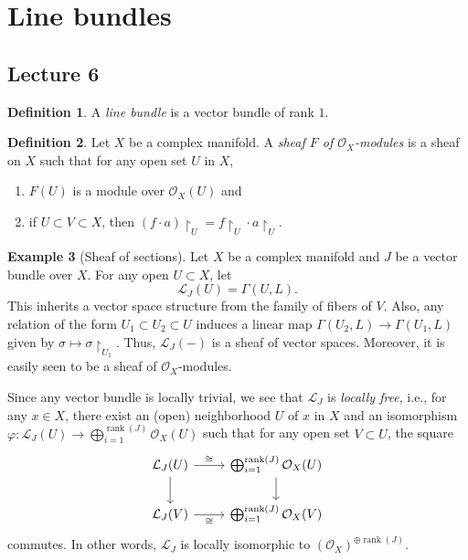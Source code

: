 \documentclass[10pt,letterpaper,cm]{nupset}
\theoremstyle{definition}
\newtheorem{defn}{Definition}[subsection]
\newtheorem{exmp}[defn]{Example}
\theoremstyle{theorem}
\theoremstyle{remark}
\renewcommand{\L}{\mathcal L}
\renewcommand{\O}{\mathcal O}
\newcommand{\1}{\mathbb{1}}
\newcommand{\0}{\vec 0}
\DeclareMathOperator{\rnk}{rank}
\newcommand{\be}{\begin{enumerate}}
\newcommand{\ee}{\end{enumerate}}
\begin{document}
\section{Line bundles}

\subsection{Lecture 6}

\begin{defn}
A \textit{line bundle} is a vector bundle of rank $1$.
\end{defn}

\begin{defn}
Let $X$ be a complex manifold.  A \textit{sheaf $F$ of $\O_X$-modules} is a sheaf on $X$ such that for any open set $U$ in $X$,
\be[label=(\roman*)]
\item $F(U)$ is a module over $\O_X(U)$ and
\item if $U \subset V \subset X$, then $\left(f\cdot a\right)\restriction_U = f\restriction_U\cdot a\restriction_U$.
\ee
\end{defn}

\begin{exmp}[Sheaf of sections]
Let $X$ be a complex manifold and $J$ be a vector bundle over $X$. For any open $U\subset X$, let $$\L_J(U) = \Gamma\left(U, L\right).$$ This inherits a vector space structure from the family of fibers of $V$. Also, any relation of the form $U_1 \subset U_2 \subset U$ induces a linear map $\Gamma\left(U_2, L\right) \to \Gamma\left(U_1, L\right)$ given by $\sigma \mapsto \sigma\restriction_{U_1}$. Thus, $\L_J\left({-}\right)$ is a sheaf of vector spaces. Moreover, it is easily seen to be a sheaf of $\O_X$-modules. 
\end{exmp}

Since any vector bundle is locally trivial, we see that $\L_J$ is \textit{locally free}, i.e., for any $x\in X$, there exist an (open) neighborhood $U$ of $x$ in $X$ and an isomorphism $\varphi : \L_J(U) \to \bigoplus_{i=1}^{\rnk(J)}\O_X(U)$ such that for any open set $V\subset U$, the square
\[
\begin{tikzcd}
\L_J(U) \arrow[r, "\cong"] \arrow[d] &  \bigoplus_{i=1}^{\rnk(J)}{\O_X(U)} \arrow[d] \\
\L_J(V) \arrow[r, "\cong"']          &  \bigoplus_{i=1}^{\rnk(J)}{\O_X(V)}          
\end{tikzcd}
\]
commutes. In other words, $\L_J$ is locally isomorphic to $\left(\O_X\right)^{\oplus{\rnk(J)}}$.
\end{document}
